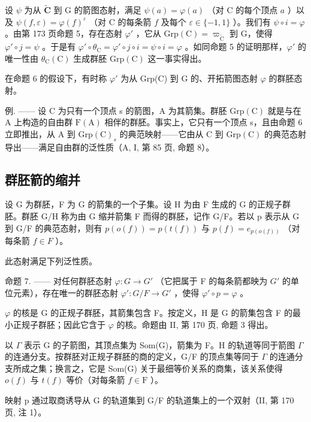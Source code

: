 设 \(\psi\) 为从 \(\widetilde{\mathbf{C}}\) 到 G 的箭图态射，满足 \(\psi(a) = \varphi(a)\) （对 C 的每个顶点 \(a\) ）以及 \(\psi(f, \varepsilon) = \varphi(f)^{\varepsilon}\) （对 C 的每条箭 \(f\) 及每个 \(\varepsilon \in \{-1, 1\}\) ）。我们有 \(\psi \circ i = \varphi\) 。由第 173 页命题 5，存在态射 \(\varphi'\) ，它从 \(\mathrm{Grp}(\mathrm{C}) = \varpi_{\widetilde{\mathrm{C}}}\) 到 G，使得 \(\varphi' \circ j = \psi\) 。于是有 \(\varphi' \circ \theta_{\mathrm{C}} = \varphi' \circ j \circ i = \psi \circ i = \varphi\) 。如同命题 5 的证明那样，\(\varphi'\) 的唯一性由 \(\theta_{\mathrm{C}}(\mathrm{C})\) 生成群胚 \(\mathrm{Grp}(\mathrm{C})\) 这一事实得出。

在命题 6 的假设下，有时称 \(\varphi'\) 为从 Grp(C) 到 G 的、开拓箭图态射 \(\varphi\) 的群胚态射。

例. —— 设 C 为只有一个顶点 s 的箭图，A 为其箭集。群胚 \(\mathrm{Grp}(\mathrm{C})\) 就是与在 A 上构造的自由群 \(\mathrm{F}(\mathrm{A})\) 相伴的群胚。事实上，它只有一个顶点 s，且由命题 6 立即推出，从 A 到 \(\mathrm{Grp}(\mathrm{C})_{s}\) 的典范映射——它由从 C 到 \(\mathrm{Grp}(\mathrm{C})\) 的典范态射导出——满足自由群的泛性质（A, I, 第 85 页, 命题 8）。

\subsection{群胚箭的缩并}

设 G 为群胚，F 为 G 的箭集的一个子集。设 H 为由 F 生成的 G 的正规子群胚。群胚 G/H 称为由 G 缩并箭集 F 而得的群胚，记作 G/F。若以 p 表示从 G 到 G/F 的典范态射，则有 \(p(o(f)) = p(t(f))\) 与 \(p(f) = e_{p(o(f))}\) （对每条箭 \(f \in F\) ）。

此态射满足下列泛性质。

命题 7. —— 对任何群胚态射 \(\varphi\colon G\to G'\) （它把属于 F 的每条箭都映为 \(G'\) 的单位元素），存在唯一的群胚态射 \(\varphi'\colon G/F\to G'\) ，使得 \(\varphi'\circ p=\varphi\) 。

\(\varphi\) 的核是 G 的正规子群胚，其箭集包含 F。按定义，H 是 G 的箭集包含 F 的最小正规子群胚；因此它含于 \(\varphi\) 的核。命题由 II, 第 170 页, 命题 3 得出。

以 \(\Gamma\) 表示 G 的子箭图，其顶点集为 Som(G)，箭集为 F。H 的轨道等同于箭图 \(\Gamma\) 的连通分支。按群胚对正规子群胚的商的定义，G/F 的顶点集等同于 \(\Gamma\) 的连通分支所成之集；换言之，它是 Som(G) 关于最细等价关系的商集，该关系使得 \(o(f)\) 与 \(t(f)\) 等价（对每条箭 \(f \in \mathrm{F}\) ）。

映射 p 通过取商诱导从 G 的轨道集到 G/F 的轨道集上的一个双射（II, 第 170 页, 注 1）。

